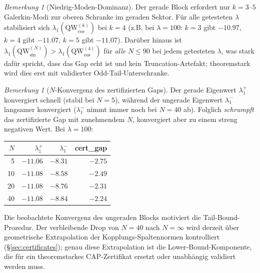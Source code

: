 ﻿\documentclass[12pt,a4paper]{article}
\theoremstyle{definition}
\theoremstyle{remark}
\newtheorem{remark}[theorem]{Bemerkung}
\begin{document}
\begin{remark}[Niedrig-Moden-Dominanz]
\label{rem:low-mode}
Der gerade Block erfordert nur $k = 3$--$5$ Galerkin-Modi zur oberen Schranke im geraden Sektor. Für alle getesteten $\lambda$ stabilisiert sich $\lambda_1(\mathrm{QW}_{\cos}^{(k)})$ bei $k = 4$ (z.B. bei $\lambda = 100$: $k = 3$ gibt $-10.97$, $k = 4$ gibt $-11.07$, $k = 5$ gibt $-11.07$). Darüber hinaus ist $\lambda_1(\mathrm{QW}_{\sin}^{(N)}) > \lambda_1(\mathrm{QW}_{\cos}^{(4)})$ für \emph{alle} $N \leq 90$ bei jedem getesteten $\lambda$, was stark dafür spricht, dass das Gap echt ist und kein Truncation-Artefakt; theoremstark wird dies erst mit validierter Odd-Tail-Unterschranke.
\end{remark}

\begin{remark}[$N$-Konvergenz des zertifizierten Gaps]
\label{rem:N-convergence}
Der gerade Eigenwert $\lambda_1^+$ konvergiert schnell (stabil bei $N = 5$), während der ungerade Eigenwert $\lambda_1^-$ langsamer konvergiert ($\lambda_1^-$ nimmt immer noch bei $N = 40$ ab). Folglich \emph{schrumpft} das zertifizierte Gap mit zunehmendem $N$, konvergiert aber zu einem streng negativen Wert. Bei $\lambda = 100$:

\begin{center}
\small
\begin{tabular}{r|r|r|r}
$N$ & $\lambda_1^+$ & $\lambda_1^-$ & cert\_gap \\\hline
5 & $-11.06$ & $-8.31$ & $-2.75$ \\
10 & $-11.08$ & $-8.58$ & $-2.49$ \\
20 & $-11.08$ & $-8.76$ & $-2.31$ \\
40 & $-11.08$ & $-8.84$ & $-2.24$
\end{tabular}
\end{center}

\noindent Die beobachtete Konvergenz des ungeraden Blocks motiviert die Tail-Bound-Prozedur. Der verbleibende Drop von $N = 40$ nach $N = \infty$ wird derzeit über geometrische Extrapolation der Kopplungs-Spaltennormen kontrolliert (\S\ref{sec:certificates}); genau diese Extrapolation ist die Lower-Bound-Komponente, die für ein theoremstarkes CAP-Zertifikat ersetzt oder unabhängig validiert werden muss.
\end{remark}
\end{document}
